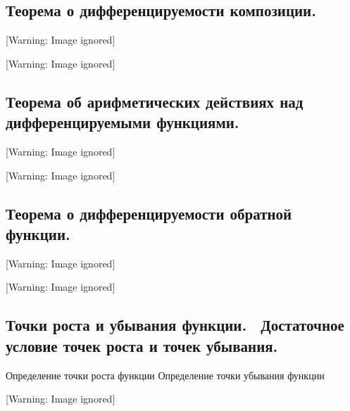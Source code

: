 \documentclass[a4paper]{article}
\begin{document}
\subsection{Теорема о дифференцируемости композиции.}
  [Warning: Image ignored] %
 

  [Warning: Image ignored] %
 

\subsection{Теорема об арифметических действиях над дифференцируемыми функциями.}
  [Warning: Image ignored] %
 

  [Warning: Image ignored] %
 

\subsection{Теорема о дифференцируемости обратной функции.}
  [Warning: Image ignored] %
 

  [Warning: Image ignored] %
 

\subsection{Точки роста и убывания функции. \ Достаточное условие точек роста и точек убывания.}
Определение точки роста функции\newline
Определение точки убывания функции

  [Warning: Image ignored] %
 
\end{document}
